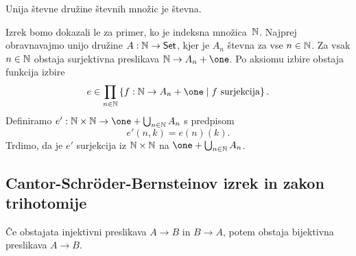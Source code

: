 \begin{izrek}
  Unija števne družine števnih množic je števna.
\end{izrek}

\begin{dokaz}
  Izrek bomo dokazali le za primer, ko je indeksna množica~$\mathbb{N}$.
  Najprej obravnavajmo unijo družine $A : \mathbb{N} \to \mathsf{Set}$, kjer je $A_n$ števna za vse $n \in \mathbb{N}$.
  Za vsak $n \in \mathbb{N}$ obstaja surjektivna preslikava $\NN \to A_n + \one$. Po aksiomu izbire obstaja funkcija izbire
  \begin{equation*}
    e \in \prod_{n \in \NN} \set{f : \NN \to A_n + \one \such \text{$f$ surjekcija}}.
  \end{equation*}
  Definiramo $e' : \NN \times \NN \to \one + \bigcup_{n \in \NN} A_n$ s predpisom
  \begin{equation*}
    e'(n, k) = e(n)(k).
  \end{equation*}
  Trdimo, da je $e'$ surjekcija iz $\mathbb{N} \times \mathbb{N}$ na $\one + \bigcup_{n \in \NN} A_n$.
\end{dokaz}


\subsection{Cantor-Schröder-Bernsteinov izrek in zakon trihotomije}

\begin{izrek}
  Če obstajata injektivni preslikava $A \to B$ in $B \to A$, potem obstaja bijektivna preslikava $A \to B$.
\end{izrek}

